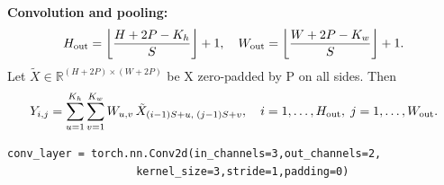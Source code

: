 \documentclass[8pt,twocolumn]{article}
\begin{document}
\textbf{Convolution and pooling:}
\[
H_{\rm out}
= \left\lfloor \frac{H + 2P - K_h}{S} \right\rfloor + 1,
\quad
W_{\rm out}
= \left\lfloor \frac{W + 2P - K_w}{S} \right\rfloor + 1.
\]
Let \(\tilde X\in\mathbb{R}^{(H+2P)\times(W+2P)}\) be X zero-padded by P on all sides.  Then
\[
Y_{i,j}
= \sum_{u=1}^{K_h}\sum_{v=1}^{K_w}
  W_{u,v}\,\tilde X_{(i-1)S + u,\;(j-1)S + v},
\quad
i=1,\dots,H_{\rm out},\;
j=1,\dots,W_{\rm out}.
\]
\noindent{}\vspace{-0.6em}
\begin{lstlisting}
conv_layer = torch.nn.Conv2d(in_channels=3,out_channels=2,
                    kernel_size=3,stride=1,padding=0)
\end{lstlisting}\vspace{-0.6em}\vspace{-0.6em}
\end{document}
